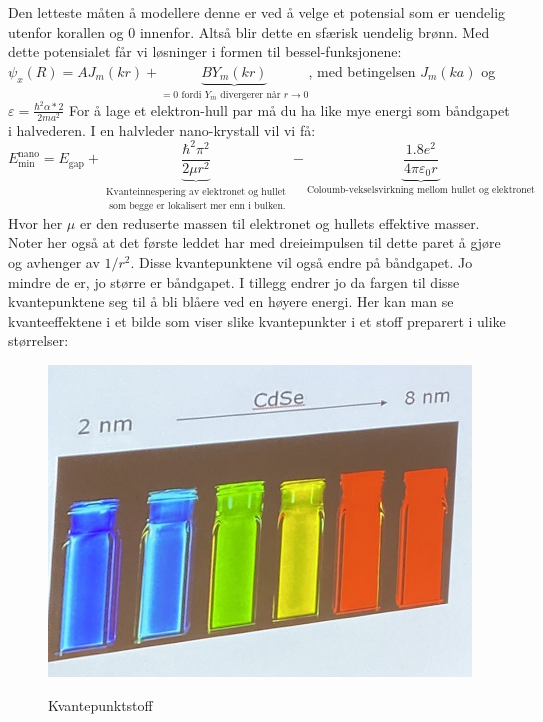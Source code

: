 \documentclass{article}
\begin{document}
Den letteste måten å modellere denne er ved å velge et potensial som er uendelig utenfor korallen og 0 innenfor. Altså blir dette en sfærisk uendelig brønn. Med dette potensialet får vi løsninger i formen til bessel-funksjonene: $\psi_x(R) = AJ_m(kr) + \underbrace{BY_m(kr)}_{=0 \text{ fordi $Y_m$ divergerer når $r\rightarrow 0$}}$, med betingelsen $J_m(ka)$ og $\varepsilon = \frac{\hbar^2 \alpha*2}{2ma^2}$
For å lage et elektron-hull par må du ha like mye energi som båndgapet i halvederen. I en halvleder nano-krystall vil vi få:
\begin{equation}
  E^{\text{nano}}_{\text{min}} = E_{\text{gap}} + \underbrace{ \frac{\hbar^2 \pi^2}{2 \mu r^2}}_{\substack{\text{Kvanteinnespering av elektronet og hullet} \\ \text{ som begge er lokalisert mer enn i bulken.}}} - \underbrace{\frac{1.8 e^2}{4 \pi \varepsilon_0 r}}_{\text{Coloumb-vekselsvirkning mellom hullet og elektronet}}
\end{equation}
Hvor her $\mu$ er den reduserte massen til elektronet og hullets effektive masser. Noter her også at det første leddet har med dreieimpulsen til dette paret å gjøre og avhenger av $1/r^2$. Disse kvantepunktene vil også endre på båndgapet. Jo mindre de er, jo større er båndgapet. I tillegg endrer jo da fargen til disse kvantepunktene seg til å bli blåere ved en høyere energi. Her kan man se kvanteeffektene i et bilde som viser slike kvantepunkter i et stoff preparert i ulike størrelser:
\begin{figure}[h]
  \centering
  \caption{Kvantepunktstoff}
  \includegraphics[scale=0.3]{bilder/kvantepunktstoff.jpg}
  \label{fig:kvantepunktstoff}
\end{figure}


\nyside
\printbibliography
\end{document}

